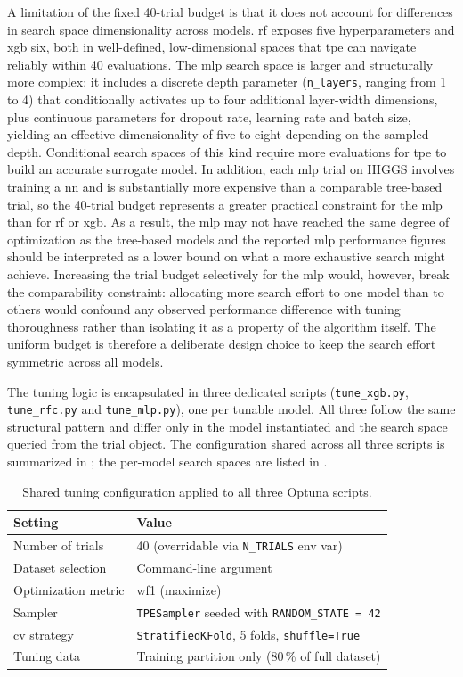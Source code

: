 A limitation of the fixed 40-trial budget is that it does not account for differences in search space dimensionality across models. \gls{rf} exposes five hyperparameters and \gls{xgb} six, both in well-defined, low-dimensional spaces that \gls{tpe} can navigate reliably within 40 evaluations. The \gls{mlp} search space is larger and structurally more complex: it includes a discrete depth parameter (\texttt{n\_layers}, ranging from 1 to 4) that conditionally activates up to four additional layer-width dimensions, plus continuous parameters for dropout rate, learning rate and batch size, yielding an effective dimensionality of five to eight depending on the sampled depth. Conditional search spaces of this kind require more evaluations for \gls{tpe} to build an accurate surrogate model. In addition, each \gls{mlp} trial on HIGGS involves training a \gls{nn} and is substantially more expensive than a comparable tree-based trial, so the 40-trial budget represents a greater practical constraint for the \gls{mlp} than for \gls{rf} or \gls{xgb}. As a result, the \gls{mlp} may not have reached the same degree of optimization as the tree-based models and the reported \gls{mlp} performance figures should be interpreted as a lower bound on what a more exhaustive search might achieve. Increasing the trial budget selectively for the \gls{mlp} would, however, break the comparability constraint: allocating more search effort to one model than to others would confound any observed performance difference with tuning thoroughness rather than isolating it as a property of the algorithm itself. The uniform budget is therefore a deliberate design choice to keep the search effort symmetric across all models.

The tuning logic is encapsulated in three dedicated scripts (\texttt{tune\_xgb.py}, \texttt{tune\_rfc.py} and \texttt{tune\_mlp.py}), one per tunable model. All three follow the same structural pattern and differ only in the model instantiated and the search space queried from the trial object. The configuration shared across all three scripts is summarized in ; the per-model search spaces are listed in .

\begin{table}[htbp]
\centering
\caption{Shared tuning configuration applied to all three Optuna scripts.}
\label{tab:tuning_config}
\begin{tabular}{ll}
\toprule
\textbf{Setting} & \textbf{Value} \\
\midrule
Number of trials & 40 (overridable via \texttt{N\_TRIALS} env var) \\
Dataset selection & Command-line argument \\
Optimization metric & \gls{wf1} (maximize) \\
Sampler & \texttt{TPESampler} seeded with \texttt{RANDOM\_STATE = 42} \\
\gls{cv} strategy & \texttt{StratifiedKFold}, 5 folds, \texttt{shuffle=True} \\
Tuning data & Training partition only (80\,\% of full dataset) \\
\bottomrule
\end{tabular}
\end{table}

